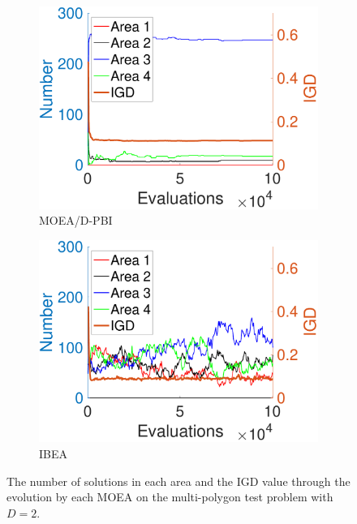 \documentclass[conference]{IEEEtran}
\begin{document}
\begin{figure}[htbp]
    \begin{subfigure}[b]{.24\textwidth}
    \includegraphics[width=\linewidth]{Section5/dim2/Diversity/MOEAD_PBI}
    \caption{MOEA/D-PBI}
    \label{fig: MOEA/D-PBI Diversity dim=2}
    \end{subfigure}
    \begin{subfigure}[b]{.24\textwidth}
    \includegraphics[width=\linewidth]{Section5/dim2/Diversity/IBEA}
    \caption{IBEA}
    \end{subfigure}

    \caption{The number of solutions in each area and the IGD value through the evolution by each MOEA on the multi-polygon test problem with $D=2$.}
    \label{fig: MOEAs Diversity dim=2}
\end{figure}
\end{document}

